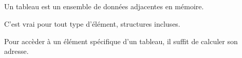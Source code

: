 ﻿\subsection{\Conclusion{}}

Un tableau est un ensemble de données adjacentes en mémoire.

C'est vrai pour tout type d'élément, structures incluses.

Pour accèder à un élément spécifique d'un tableau, il suffit de calculer son adresse.
